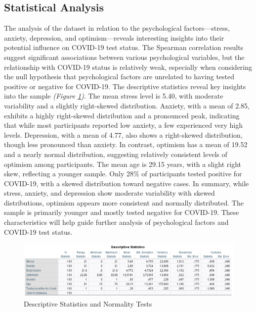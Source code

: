 \documentclass[a4paper]{article}
\begin{document}
\subsection{Statistical Analysis}
\vspace{0.5em}
The analysis of the dataset in relation to the psychological factors—stress, anxiety, depression, and optimism—reveals interesting insights into their potential influence on COVID-19 test status.
The Spearman correlation results suggest significant associations between various psychological variables, but the relationship with COVID-19 status is relatively weak,
especially when considering the null hypothesis that psychological factors are unrelated to having tested positive or negative for COVID-19.
\vspace{0.5em}\newline
The descriptive statistics reveal key insights into the sample \textit{(Figure \ref{fig:descriptiveSts})}. 
The mean stress level is 5.40, with moderate variability and a slightly right-skewed distribution. Anxiety, with a mean of 2.85, exhibits a highly right-skewed distribution and a pronounced peak,
indicating that while most participants reported low anxiety, a few experienced very high levels.
Depression, with a mean of 4.77, also shows a right-skewed distribution, though less pronounced than anxiety.
In contrast, optimism has a mean of 19.52 and a nearly normal distribution, suggesting relatively consistent levels of optimism among participants.\newline
The mean age is 29.15 years, with a slight right skew, reflecting a younger sample.
Only 28\% of participants tested positive for COVID-19, with a skewed distribution toward negative cases.\newline
In summary, while stress, anxiety, and depression show moderate variability with skewed distributions, optimism appears more consistent and normally distributed. 
The sample is primarily younger and mostly tested negative for COVID-19. These characteristics will help guide further analysis of psychological factors and COVID-19 test status.

\vspace{1.5em}

\begin{figure}[ht]
  \centering
  \caption{Descriptive Statistics and Normality Tests}
  \label{fig:descriptiveSts}
  \includegraphics[width=\textwidth]{img/descriptive_statistics.png}  %
\end{figure}
\end{document}
